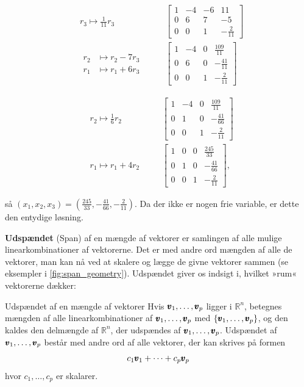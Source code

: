 \begin{example}
\[
\begin{alignedat}{3}
& r_3 \mapsto \frac{1}{11} r_3 \quad &
& \left[\begin{array}{cccc}
1 & -4 & -6 & 11 \\
0 & 6 & 7 & -5 \\
0 & 0 & 1 & -\frac{2}{11}
\end{array}\right] \\[10pt]
& \begin{aligned}
    r_2 & \mapsto r_2 - 7r_3 \\
    r_1 & \mapsto r_1 + 6r_3
\end{aligned} & \quad &
\left[\begin{array}{cccc}
1 & -4 & 0 & \frac{109}{11} \\
0 & 6 & 0 & -\frac{41}{11} \\
0 & 0 & 1 & -\frac{2}{11}
\end{array}\right]
\end{alignedat}
\]

\[
\begin{alignedat}{3}
& r_2 \mapsto \frac{1}{6}r_2 \quad &
& \left[\begin{array}{cccc}
1 & -4 & 0 & \frac{109}{11} \\
0 & 1 & 0 & -\frac{41}{66} \\
0 & 0 & 1 & -\frac{2}{11}
\end{array}\right] \\[10pt]
& r_1 \mapsto r_1 + 4r_2 \quad &
& \left[\begin{array}{cccc}
1 & 0 & 0 & \frac{245}{33} \\
0 & 1 & 0 & -\frac{41}{66} \\
0 & 0 & 1 & -\frac{2}{11}
\end{array}\right],
\end{alignedat}
\]

så $\left(x_1, x_2, x_3\right)=\left(\frac{245}{33},-\frac{41}{66},-\frac{2}{11}\right)$. Da der ikke er nogen frie variable, er dette den entydige løsning.

\end{example}

\textbf{Udspændet} (Span) af en mængde af vektorer er samlingen af alle mulige linearkombinationer af vektorerne. Det er med andre ord mængden af alle de vektorer, man kan nå ved at skalere og lægge de givne vektorer sammen (se eksempler i \autoref{fig:span_geometry}). Udspændet giver os indsigt i, hvilket »rum« vektorerne dækker:

\begin{definition}{Udspændet af en mængde af vektorer}
    Hvis $\pmb{v}_1, \ldots, \pmb{v}_p$ ligger i $\mathbb{R}^n$, betegnes mængden af alle linearkombinationer af $\pmb{v}_1, \ldots, \pmb{v}_p$ med  $\left\{\pmb{v}_1, \ldots, \pmb{v}_p\right\}$, og den kaldes den delmængde af $\mathbb{R}^n$, der udspændes af $\pmb{v}_1, \ldots, \pmb{v}_p$. Udspændet af $\pmb{v}_1, \ldots, \pmb{v}_p$ består med andre ord af alle vektorer, der kan skrives på formen
    $$
    c_1 \pmb{v}_1 + \cdots + c_p \pmb{v}_p
    $$
    hvor $c_1, \ldots, c_p$ er skalarer.

\end{definition}

